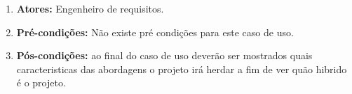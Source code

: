 \begin{enumerate}
	\item \textbf{Atores:}
		Engenheiro de requisitos. 
	\item \textbf{Pré-condições:}
		Não existe pré condições para este caso de uso.
	\item \textbf{Pós-condições:}
		ao final do caso de uso deverão ser mostrados quais caracteristicas das abordagens o projeto irá herdar a fim de ver quão hibrido é o projeto.
\end{enumerate}
